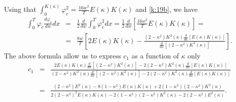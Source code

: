 \documentclass[final,11pt,leqno]{amsart}
\begin{document}
              Using that $\int_{0}^{K(\kappa)}{\varphi}_c^2={\frac{{16 w^2}}{{T}}} E(\kappa)K({\kappa})$ and
              \eqref{k:19b}, we have
                \begin{eqnarray*}
                  \int_{0}^{T}{{\varphi}_c{\frac{d{\varphi}_c}{dw}}dx} &=& {\frac{1}{2}}{\frac{d}{dw}}\int_{0}^{T}{{\varphi}_c^2}dx={\frac{1}{2}}{\frac{d}{dw}}[{\frac{16w^2}{T}}
                  E(\kappa)K(\kappa)] = \\
                  &=& {\frac{8w}{T}}\left[
                  2E(\kappa)K(\kappa)-{\frac{(2-\kappa^2)K^2(\kappa){\frac{d}{d\kappa}}[E(\kappa)K(\kappa)]}{{\frac{d}{d\kappa}}[(2-\kappa^2)K^2(\kappa)]}}\right].
                \end{eqnarray*}
The above formula allow us
 to  express  $c_1$   as a function of $\kappa$ only
 \begin{eqnarray*}
 c_1 &=& \frac{2E(\kappa)K(\kappa)\frac{d}{d\kappa}[(2-\kappa^2)K^2(\kappa)]-2(2-\kappa^2)K^2(\kappa)\frac{d}{d\kappa}[E(\kappa)K(\kappa)]}
                  {(2-\kappa^2)K^2(\kappa)\frac{d}{d\kappa}[(2-\kappa^2)K^2(\kappa)]-2(2-\kappa^2)K^2(\kappa)\frac{d}{d\kappa}[E(\kappa)K(\kappa)]}\\
                  \\
                  &=&{\frac{(2-\kappa^2)E^2(\kappa)-8(1-\kappa^2)E(\kappa)K(\kappa)+2(1-\kappa^2)(2-\kappa^2)K^2(\kappa)}
                  {2(2-\kappa^2)^2E(\kappa)K(\kappa)-2(1-\kappa^2)(2-\kappa^2)K^2(\kappa)-2(2-\kappa^2)E^2(\kappa)}}.
            \end{eqnarray*}
\end{document}
